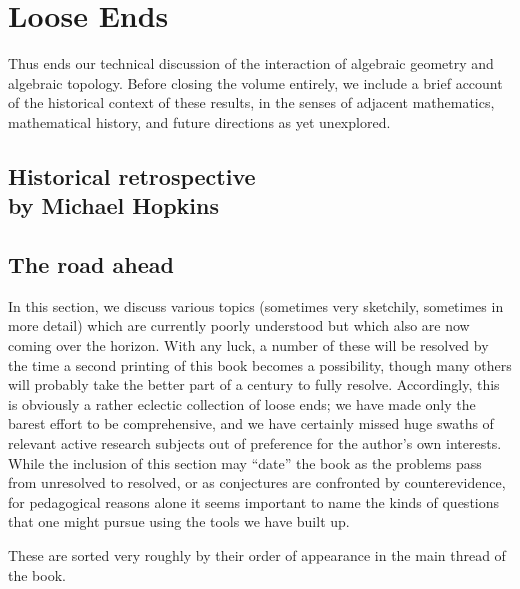 
\chapter{Loose Ends}




Thus ends our technical discussion of the interaction of algebraic geometry and algebraic topology.
Before closing the volume entirely, we include a brief account of the historical context of these results, in the senses of adjacent mathematics, mathematical history, and future directions as yet unexplored.



\section[Historical retrospective]{Historical retrospective \\ by Michael Hopkins}








\section{The road ahead}\label{OpenQuestionsSection}



In this section, we discuss various topics (sometimes very sketchily, sometimes in more detail) which are currently poorly understood but which also are now coming over the horizon.
With any luck, a number of these will be resolved by the time a second printing of this book becomes a possibility, though many others will probably take the better part of a century to fully resolve.
Accordingly, this is obviously a rather eclectic collection of loose ends; we have made only the barest effort to be comprehensive, and we have certainly missed huge swaths of relevant active research subjects out of preference for the author's own interests.
While the inclusion of this section may ``date'' the book as the problems pass from unresolved to resolved, or as conjectures are confronted by counterevidence, for pedagogical reasons alone it seems important to name the kinds of questions that one might pursue using the tools we have built up.

These are sorted very roughly by their order of appearance in the main thread of the book.









